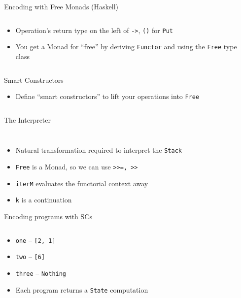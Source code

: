 \documentclass[hyperref={pdfpagelabels=false},12pt]{beamer}
\newcommand{\code}[2]{\texttt{#2}}
\newcommand{\haskell}[1]{\code{haskell}{#1}}
\newcommand{\pygmentLines}[5]{\inputminted[bgcolor=lightgray,linenos,fontsize=#1,firstline=#2,lastline=#3,autogobble]{#4}{#5}}
\begin{document}
\begin{frame}{Encoding with Free Monads (Haskell)}
  \pygmentLines{\normalsize}{17}{21}{haskell}{code/Free.hs}
  \vspace{-1cm}
  \begin{itemize}
    \item Operation's return type on the left of \haskell{->}, \haskell{()} for
      \haskell{Put}
    \item You get a Monad for ``free'' by deriving \haskell{Functor} and
      using the \haskell{Free} type class
  \end{itemize}
  \pygmentLines{\normalsize}{23}{23}{haskell}{code/Free.hs}
\end{frame}

\begin{frame}{Smart Constructors}
  \begin{itemize}
    \item Define ``smart constructors'' to lift your operations into \haskell{Free}
  \end{itemize}
  \pygmentLines{\normalsize}{25}{32}{haskell}{code/Free.hs}
\end{frame}

\begin{frame}{The Interpreter}
  \pygmentLines{\scriptsize}{10}{11}{haskell}{code/Free.hs}
  \vspace{-1cm}
  \pygmentLines{\normalsize}{34}{40}{haskell}{code/Free.hs}
  \vspace{-0.5cm}
  \begin{itemize}
    \item Natural transformation required to interpret the \haskell{Stack}
    \item \haskell{Free} is a Monad, so we can use \haskell{>>=, >>}
    \item \haskell{iterM} evaluates the functorial context away
    \item \haskell{k} is a continuation
  \end{itemize}
\end{frame}

\begin{frame}{Encoding programs with SCs}
  \pygmentLines{\scriptsize}{42}{56}{haskell}{code/Free.hs}
  \vspace{-0.5cm}
  \begin{itemize}
    \item \haskell{one} -- \haskell{[2, 1]}
    \item \haskell{two} -- \haskell{[6]}
    \item \haskell{three} -- \haskell{Nothing}
    \item Each program returns a \haskell{State} computation
  \end{itemize}
\end{frame}
\end{document}

